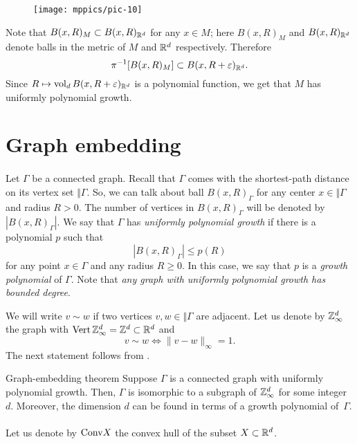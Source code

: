 \documentclass[a4paper,10pt]{article}
\begin{document}
{

\begin{wrapfigure}{o}{45 mm}
\vskip-14mm
\centering
\texttt{[image: mppics/pic-10]}
\vskip5mm
\end{wrapfigure}

Note that $B(x,R)_M\subset B(x,R)_{\mathbb{R}^d}$ for any $x\in M$;
here $B(x,R)_M$ and $B(x,R)_{\mathbb{R}^d}$ denote balls in the metric of $M$ and $\mathbb{R}^d$ respectively.
Therefore 
\[\pi^{-1}[B(x,R)_M]\subset B(x,R+\varepsilon)_{\mathbb{R}^d}.\]
Since $R\mapsto \operatorname{\rm vol}_d B(x,R+\varepsilon)_{\mathbb{R}^d}$ is a polynomial function, we get that $M$ has uniformly  polynomial growth.
\qeds

}

\section*{Graph embedding}

\paragraph{}\label{par:graph-embedding}
Let $\Gamma$ be a connected graph.
Recall that $\Gamma$ comes with the shortest-path distance on its vertex set $\Vert \Gamma$.
So, we can talk about ball $B(x,R)_\Gamma$ for any center $x\in \Vert \Gamma$ and radius $R>0$.
The number of vertices in $B(x,R)_\Gamma$ will be denoted by $|B(x,R)_\Gamma|$.
We say that $\Gamma$ has \emph{uniformly polynomial growth} if there is a polynomial $p$ such that 
\[|B(x,R)_\Gamma|\le p(R)\]
for any point $x\in \Gamma$ and any radius $R\ge 0$.
In this case, we say that $p$ is a \emph{growth polynomial} of $\Gamma$.
Note that \textit{any graph with uniformly polynomial growth has bounded degree}.

We will write $v\sim w$ if two vertices $v,w\in \Vert \Gamma$ are adjacent.
Let us denote by $\mathbb{Z}^d_\infty$ the graph with $\mathop{\rm Vert} \mathbb{Z}^d_\infty=\mathbb{Z}^d\subset \mathbb{R}^d$ and
\[v\sim w \iff  \|v-w\|_\infty=1.\]
The next statement follows from \cite[Theorem 5.5]{krauthgamer-lee1}.

\begin{thm}{Graph-embedding theorem}\label{thm:graph-embedding}
Suppose $\Gamma$ is a connected graph with uniformly polynomial growth.
Then, $\Gamma$ is isomorphic to a subgraph of $\mathbb{Z}^d_\infty$ for some integer~$d$.
Moreover, the dimension $d$ can be found in terms of a growth polynomial of~$\Gamma$.
\end{thm}

\paragraph{}\label{par:Phi}
Let us denote by $\text{\rm Conv} X$ the convex hull of the subset $X\subset \mathbb{R}^d$.
\end{document}
